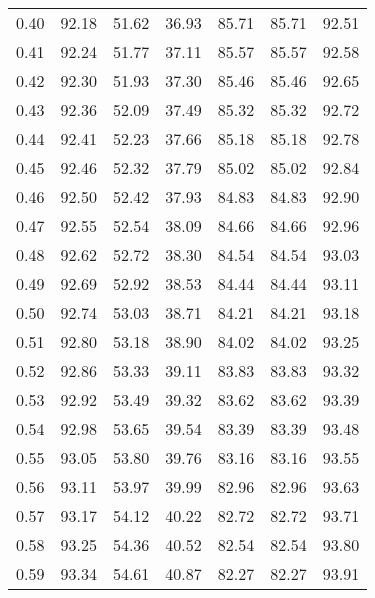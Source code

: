 \begin{tabular}{|c|c|c|c|c|c|c|}
      0.40 &     92.18 &     51.62 &      36.93 &   85.71 &      85.71 &         92.51 \\
      0.41 &     92.24 &     51.77 &      37.11 &   85.57 &      85.57 &         92.58 \\
      0.42 &     92.30 &     51.93 &      37.30 &   85.46 &      85.46 &         92.65 \\
      0.43 &     92.36 &     52.09 &      37.49 &   85.32 &      85.32 &         92.72 \\
      0.44 &     92.41 &     52.23 &      37.66 &   85.18 &      85.18 &         92.78 \\
      0.45 &     92.46 &     52.32 &      37.79 &   85.02 &      85.02 &         92.84 \\
      0.46 &     92.50 &     52.42 &      37.93 &   84.83 &      84.83 &         92.90 \\
      0.47 &     92.55 &     52.54 &      38.09 &   84.66 &      84.66 &         92.96 \\
      0.48 &     92.62 &     52.72 &      38.30 &   84.54 &      84.54 &         93.03 \\
      0.49 &     92.69 &     52.92 &      38.53 &   84.44 &      84.44 &         93.11 \\
      0.50 &     92.74 &     53.03 &      38.71 &   84.21 &      84.21 &         93.18 \\
      0.51 &     92.80 &     53.18 &      38.90 &   84.02 &      84.02 &         93.25 \\
      0.52 &     92.86 &     53.33 &      39.11 &   83.83 &      83.83 &         93.32 \\
      0.53 &     92.92 &     53.49 &      39.32 &   83.62 &      83.62 &         93.39 \\
      0.54 &     92.98 &     53.65 &      39.54 &   83.39 &      83.39 &         93.48 \\
      0.55 &     93.05 &     53.80 &      39.76 &   83.16 &      83.16 &         93.55 \\
      0.56 &     93.11 &     53.97 &      39.99 &   82.96 &      82.96 &         93.63 \\
      0.57 &     93.17 &     54.12 &      40.22 &   82.72 &      82.72 &         93.71 \\
      0.58 &     93.25 &     54.36 &      40.52 &   82.54 &      82.54 &         93.80 \\
      0.59 &     93.34 &     54.61 &      40.87 &   82.27 &      82.27 &         93.91 \\

\end{tabular}
